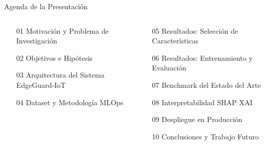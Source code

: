 \documentclass[aspectratio=169, 10pt]{beamer}
\begin{document}
\begin{frame}{Agenda de la Presentación}
  \begin{columns}[T]
    \begin{column}{0.48\textwidth}
      \begin{enumerate}\small
        \item[\textcolor{cyanneon}{01}] Motivación y Problema de Investigación
        \item[\textcolor{cyanneon}{02}] Objetivos e Hipótesis
        \item[\textcolor{cyanneon}{03}] Arquitectura del Sistema EdgeGuard-IoT
        \item[\textcolor{cyanneon}{04}] Dataset y Metodología MLOps
      \end{enumerate}
    \end{column}
    \begin{column}{0.48\textwidth}
      \begin{enumerate}\small
        \item[\textcolor{goldacc}{05}] Resultados: Selección de Características
        \item[\textcolor{goldacc}{06}] Resultados: Entrenamiento y Evaluación
        \item[\textcolor{goldacc}{07}] Benchmark del Estado del Arte
        \item[\textcolor{goldacc}{08}] Interpretabilidad SHAP XAI
        \item[\textcolor{cyanneon}{09}] Despliegue en Producción
        \item[\textcolor{cyanneon}{10}] Conclusiones y Trabajo Futuro
      \end{enumerate}
    \end{column}
  \end{columns}
\end{frame}
\end{document}
